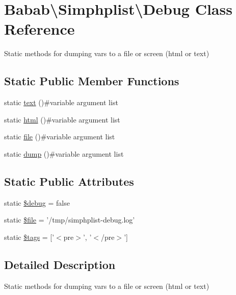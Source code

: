 \hypertarget{classBabab_1_1Simphplist_1_1Debug}{\section{Babab\textbackslash{}Simphplist\textbackslash{}Debug Class Reference}
\label{classBabab_1_1Simphplist_1_1Debug}
}


Static methods for dumping vars to a file or screen (html or text)  


\subsection*{Static Public Member Functions}
\begin{DoxyCompactItemize}
\item 
static \hyperlink{classBabab_1_1Simphplist_1_1Debug_afbd05d38d6bdfac72519e8a46b221581}{text} ()\#variable argument list
\item 
static \hyperlink{classBabab_1_1Simphplist_1_1Debug_a623ef81780701ab0cf0d1d880f732e0e}{html} ()\#variable argument list
\item 
static \hyperlink{classBabab_1_1Simphplist_1_1Debug_a9bcd51c08a5b03c356df1014150d492d}{file} ()\#variable argument list
\item 
static \hyperlink{classBabab_1_1Simphplist_1_1Debug_aabc0c9bcc28492a385f1ab6bffea1f07}{dump} ()\#variable argument list
\end{DoxyCompactItemize}
\subsection*{Static Public Attributes}
\begin{DoxyCompactItemize}
\item 
static \hyperlink{classBabab_1_1Simphplist_1_1Debug_a5e23afa4b737164198d703572f3ecf6a}{\$debug} = false
\item 
static \hyperlink{classBabab_1_1Simphplist_1_1Debug_a04219b8bad8e1699038c301c0d7b3145}{\$file} = '/tmp/simphplist-\/debug.\+log'
\item 
static \hyperlink{classBabab_1_1Simphplist_1_1Debug_a1a1a6bf5387c2ed978a5d2c143598117}{\$tags} = \mbox{[}'$<$pre$>$', '$<$/pre$>$'\mbox{]}
\end{DoxyCompactItemize}


\subsection{Detailed Description}
Static methods for dumping vars to a file or screen (html or text) 

